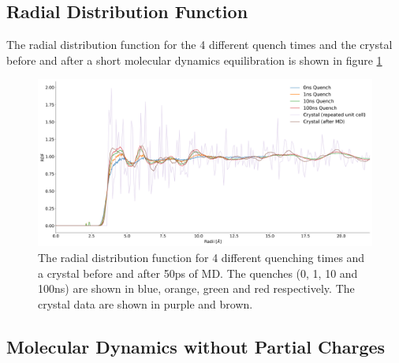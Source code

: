 \subsection{Radial Distribution Function}
The radial distribution function for the 4 different quench times and the crystal before and after a short molecular dynamics equilibration is shown in figure \ref{fig:RDF}

\begin{figure}[h]
	\includegraphics[width=\textwidth]{./img/DifferentQuenchTimes/RDF.png}
	\caption{\label{fig:RDF}The radial distribution function for 4 different quenching times and a crystal before and after 50ps of MD. The quenches (0, 1, 10 and 100ns) are shown in blue, orange, green and red respectively. The crystal data are shown in purple and brown.}
\end{figure}


\subsection{Molecular Dynamics without Partial Charges}
\label{sect:partial_charge_importance}

